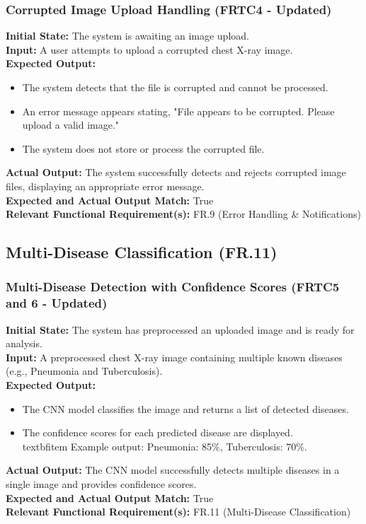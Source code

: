 \documentclass[12pt, titlepage]{article}
\begin{document}
\subsubsection{Corrupted Image Upload Handling (FRTC4 - Updated)}
\textbf{Initial State:} The system is awaiting an image upload.\\
\textbf{Input:} A user attempts to upload a corrupted chest X-ray image.\\
\textbf{Expected Output:}
\begin{itemize}
\item The system detects that the file is corrupted and cannot be processed.
\item An error message appears stating, "File appears to be corrupted. Please upload a valid image."
\item The system does not store or process the corrupted file.
\end{itemize}
\textbf{Actual Output:} The system successfully detects and rejects corrupted image files, displaying an appropriate error message.\\
\textbf{Expected and Actual Output Match:} True\\
\textbf{Relevant Functional Requirement(s):} FR.9 (Error Handling \& Notifications)

\subsection{Multi-Disease Classification (FR.11)}
\subsubsection{Multi-Disease Detection with Confidence Scores (FRTC5 and 6 - Updated)}
\textbf{Initial State:} The system has preprocessed an uploaded image and is ready for analysis.\\
\textbf{Input:} A preprocessed chest X-ray image containing multiple known diseases (e.g., Pneumonia and Tuberculosis).\\
\textbf{Expected Output:}
\begin{itemize}
\item The CNN model classifies the image and returns a list of detected diseases.
\item The confidence scores for each predicted disease are displayed.
\\textbf{item Example output:} Pneumonia: 85\%, Tuberculosis: 70\%.
\end{itemize}
\textbf{Actual Output:} The CNN model successfully detects multiple diseases in a single image and provides confidence scores.\\
\textbf{Expected and Actual Output Match:} True\\
\textbf{Relevant Functional Requirement(s):} FR.11 (Multi-Disease Classification)\\
\end{document}
